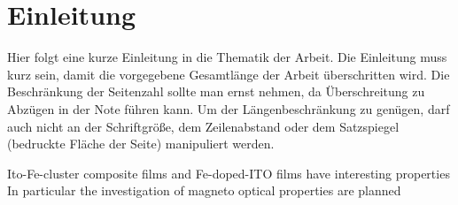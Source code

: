 \chapter{Einleitung}
Hier folgt eine kurze Einleitung in die Thematik der Arbeit.
Die Einleitung muss kurz sein, damit die vorgegebene Gesamtlänge der 
Arbeit überschritten wird. 
Die Beschränkung der Seitenzahl sollte man ernst nehmen,
da Überschreitung zu Abzügen in der Note führen kann. 
Um der Längenbeschränkung zu genügen, darf auch nicht an der Schriftgröße,
dem Zeilenabstand oder dem Satzspiegel (bedruckte Fläche der Seite) manipuliert werden.

Ito-Fe-cluster composite films and Fe-doped-ITO films have interesting properties \cite{Peng.2005, Ohno.2007, Shen.2015}
In particular the investigation of magneto optical properties are planned 

